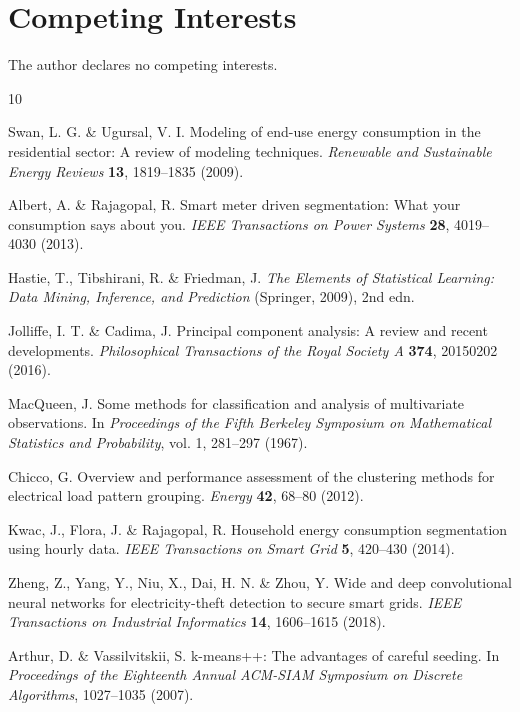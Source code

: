 \documentclass[11pt]{article}
\begin{document}
\section*{Competing Interests}

The author declares no competing interests.

\begin{thebibliography}{10}

Swan, L. G. \& Ugursal, V. I.
\newblock Modeling of end-use energy consumption in the residential sector: A review of modeling techniques.
\newblock \textit{Renewable and Sustainable Energy Reviews} \textbf{13}, 1819--1835 (2009).

Albert, A. \& Rajagopal, R.
\newblock Smart meter driven segmentation: What your consumption says about you.
\newblock \textit{IEEE Transactions on Power Systems} \textbf{28}, 4019--4030 (2013).

Hastie, T., Tibshirani, R. \& Friedman, J.
\newblock \textit{The Elements of Statistical Learning: Data Mining, Inference, and Prediction} (Springer, 2009), 2nd edn.

Jolliffe, I. T. \& Cadima, J.
\newblock Principal component analysis: A review and recent developments.
\newblock \textit{Philosophical Transactions of the Royal Society A} \textbf{374}, 20150202 (2016).

MacQueen, J.
\newblock Some methods for classification and analysis of multivariate observations.
\newblock In \textit{Proceedings of the Fifth Berkeley Symposium on Mathematical Statistics and Probability}, vol. 1, 281--297 (1967).

Chicco, G.
\newblock Overview and performance assessment of the clustering methods for electrical load pattern grouping.
\newblock \textit{Energy} \textbf{42}, 68--80 (2012).

Kwac, J., Flora, J. \& Rajagopal, R.
\newblock Household energy consumption segmentation using hourly data.
\newblock \textit{IEEE Transactions on Smart Grid} \textbf{5}, 420--430 (2014).

Zheng, Z., Yang, Y., Niu, X., Dai, H. N. \& Zhou, Y.
\newblock Wide and deep convolutional neural networks for electricity-theft detection to secure smart grids.
\newblock \textit{IEEE Transactions on Industrial Informatics} \textbf{14}, 1606--1615 (2018).

Arthur, D. \& Vassilvitskii, S.
\newblock k-means++: The advantages of careful seeding.
\newblock In \textit{Proceedings of the Eighteenth Annual ACM-SIAM Symposium on Discrete Algorithms}, 1027--1035 (2007).

\end{thebibliography}
\end{document}

